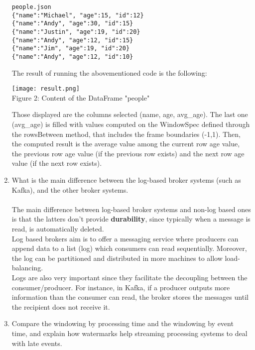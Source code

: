 \documentclass[]{report}
\begin{document}
\begin{enumerate}
\begin{verbatim}
people.json
{"name":"Michael", "age":15, "id":12}
{"name":"Andy", "age":30, "id":15}
{"name":"Justin", "age":19, "id":20}
{"name":"Andy", "age":12, "id":15}
{"name":"Jim", "age":19, "id":20}
{"name":"Andy", "age":12, "id":10}
 \end{verbatim}
 The result of running the abovementioned code is the following: 
 \begin{center}
  \texttt{[image: result.png]}\\
  Figure 2: Content of the DataFrame "people"
 \end{center}
Those displayed are the columns selected (name, age, avg\_age). The last one (avg\_age) is filled with values computed on the WindowSpec defined through the rowsBetween method, that includes the frame boundaries (-1,1). Then, the computed result is the average value among the current row age value, the previous row age value (if the previous row exists) and the next row age value (if the next row exists).
 
 \item What is the main difference between the log-based broker systems (such as Kafka), and the other broker systems.\\\\
\noindent The main difference between log-based broker systems and non-log based ones is that the latters don't provide \textbf{durability}, since typically when a message is read, is automatically deleted. \\
Log based brokers aim is to offer a messaging service where producers can append data to a list (log) which consumers can read sequentially. Moreover, the log can be partitioned and distributed in more machines to allow load-balancing. \\Logs are also very important since they facilitate the decoupling between the consumer/producer. For instance, in Kafka, if a producer outputs more information than the consumer can read, the broker stores the messages until the recipient does not receive it.
 
 \item Compare the windowing by processing time and the windowing by event time, and explain how watermarks help streaming processing systems to deal with late events.
 

\end{enumerate}
\end{document}
